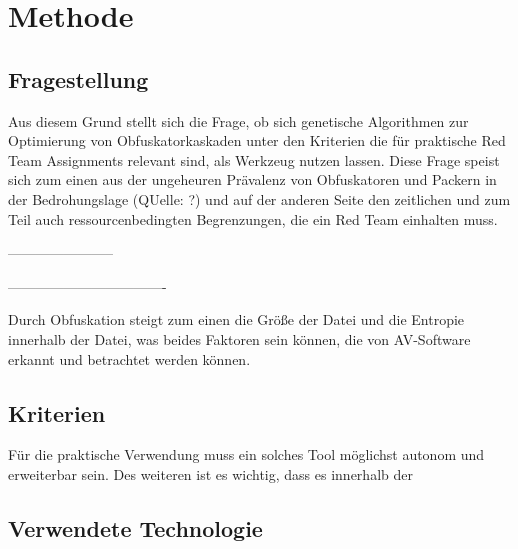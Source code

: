 \chapter{Methode}
\label{chapt:Methode}
\section{Fragestellung}
Aus diesem Grund stellt sich die Frage, ob sich genetische Algorithmen zur Optimierung von Obfuskatorkaskaden unter den Kriterien die für praktische Red Team Assignments relevant sind, als Werkzeug nutzen lassen. Diese Frage speist sich zum einen aus der ungeheuren Prävalenz von Obfuskatoren und Packern in der Bedrohungslage (QUelle: ?) und auf der anderen Seite den zeitlichen und zum Teil auch ressourcenbedingten Begrenzungen, die ein Red Team einhalten muss. 

-----------------------

----------------------------------

Durch Obfuskation steigt zum einen die Größe der Datei und die Entropie innerhalb der Datei, was beides Faktoren sein können, die von AV-Software erkannt und betrachtet werden können.



\section{Kriterien}
Für die praktische Verwendung muss ein solches Tool möglichst autonom und erweiterbar sein. Des weiteren ist es wichtig, dass es innerhalb der 


\section{Verwendete Technologie}
